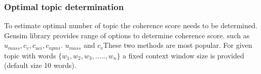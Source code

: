 \documentclass[sn-mathphys,Numbered]{sn-jnl}%
\theoremstyle{thmstyleone}%
\theoremstyle{thmstyletwo}%
\theoremstyle{thmstylethree}%
\begin{document}
\subsubsection{Optimal topic determination}
To estimate optimal number of topic the coherence score needs to be determined. Gensim library provides range of options to determine coherence score. such as \(u_{mass},c_{v},c_{uci},c_{npmi}\). \(u_{mass}\) and \(c_{v}\)These two methods are most popular. For given topic with words \(\{ w_{1},w_{2},w_{3},\ldots..,w_{n}\}\) a fixed context window size is provided (default size 10 words). 
\end{document}
